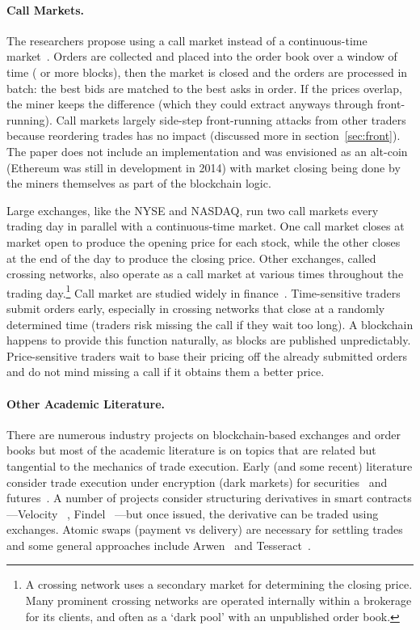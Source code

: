 \paragraph{Call Markets.} The researchers propose using a call market instead of a continuous-time market~\cite{clark2014decentralizing}. Orders are collected and placed into the order book over a window of time ( or more blocks), then the market is closed and the orders are processed in batch: the best bids are matched to the best asks in order. If the prices overlap, the miner keeps the difference (which they could extract anyways through front-running). Call markets largely side-step front-running attacks from other traders because reordering trades has no impact (discussed more in section~\ref{sec:front}). The paper does not include an implementation and was envisioned as an alt-coin (Ethereum was still in development in 2014) with market closing being done by the miners themselves as part of the blockchain logic.

Large exchanges, like the NYSE and NASDAQ, run two call markets every trading day in parallel with a continuous-time market. One call market closes at market open to produce the opening price for each stock, while the other closes at the end of the day to produce the closing price. Other exchanges, called crossing networks, also operate as a call market at various times throughout the trading day.\footnote{A crossing network uses a secondary market for determining the closing price. Many prominent crossing networks are operated internally within a brokerage for its clients, and often as a `dark pool' with an unpublished order book.} Call market are studied widely in finance~\cite{Har03}. Time-sensitive traders submit orders early, especially in crossing networks that close at a randomly determined time (traders risk missing the call if they wait too long). A blockchain happens to provide this function naturally, as blocks are published unpredictably. Price-sensitive traders wait to base their pricing off the already submitted orders and do not mind missing a call if it obtains them a better price. 

\paragraph{Other Academic Literature.} There are numerous industry projects on blockchain-based exchanges and order books but most of the academic literature is on topics that are related but tangential to the mechanics of trade execution. Early (and some recent) literature consider trade execution under encryption (\ie dark markets) for securities~\cite{TP07,YSLT10,TW12,cartlidge2019mpc} and futures~\cite{massacci2018futuresmex}. A number of projects consider structuring derivatives in smart contracts---Velocity ~\cite{eskandari2017feasibility}, Findel ~\cite{biryukov2017findel}---but once issued, the derivative can be traded using exchanges. Atomic swaps (\ie payment vs delivery) are necessary for settling trades and some general approaches include Arwen~\cite{heilman2020arwen} and Tesseract~\cite{bentov2017tesseract}.

